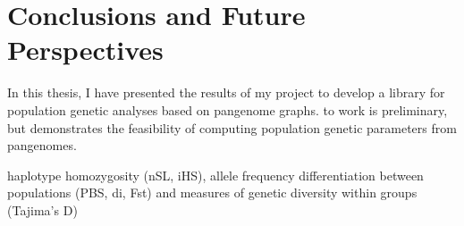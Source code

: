 
\chapter{Conclusions and Future Perspectives }%

\label{Chapter6} %




In this thesis, I have presented the results of my project to develop a library for population genetic analyses based on pangenome graphs.
to work is preliminary, but demonstrates the feasibility of computing population genetic parameters from pangenomes.

haplotype homozygosity (nSL, iHS), allele
frequency differentiation between populations (PBS, di, Fst) and measures of genetic
diversity within groups (Tajima’s D)
 